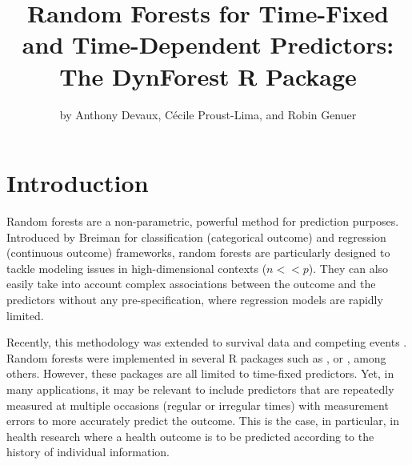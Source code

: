 \title{Random Forests for Time-Fixed and Time-Dependent Predictors: The DynForest R Package}


\author{by Anthony Devaux, Cécile Proust-Lima, and Robin Genuer}

\maketitle


\section{Introduction}\label{introduction}

Random forests are a non-parametric, powerful method for prediction purposes. Introduced by Breiman \citep{breiman_random_2001} for classification (categorical outcome) and regression (continuous outcome) frameworks, random forests are particularly designed to tackle modeling issues in high-dimensional contexts (\(n << p\)). They can also easily take into account complex associations between the outcome and the predictors without any pre-specification, where regression models are rapidly limited.

Recently, this methodology was extended to survival data \citep{ishwaran_random_2008} and competing events \citep{ishwaran_random_2014}. Random forests were implemented in several R \citep{R_2019} packages such as  \citep{ishawaran_fast_2022},  \citep{wright_ranger_2017} or  \citep{chen_xgboost_2016}, among others. However, these packages are all limited to time-fixed predictors. Yet, in many applications, it may be relevant to include predictors that are repeatedly measured at multiple occasions (regular or irregular times) with measurement errors to more accurately predict the outcome. This is the case, in particular, in health research where a health outcome is to be predicted according to the history of individual information.

